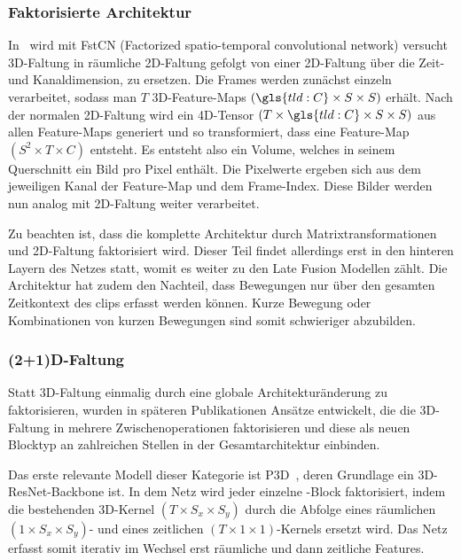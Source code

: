 \subsubsection{Faktorisierte Architektur}

In~\cite{Sun15} wird mit FstCN (Factorized spatio-temporal convolutional network) versucht 3D-Faltung in räumliche 2D-Faltung gefolgt von einer 2D-Faltung über die Zeit- und Kanaldimension, zu ersetzen.
Die Frames werden zunächst einzeln verarbeitet, sodass man ${T}$ 3D-Feature-Maps $(\gls{tld:C} \times S \times S)$ erhält.
Nach der normalen 2D-Faltung wird ein 4D-Tensor $(T \times \gls{tld:C} \times S \times S)$ aus allen Feature-Maps generiert und so transformiert, dass eine Feature-Map $(S^2 \times T \times C)$ entsteht.
Es entsteht also ein Volume, welches in seinem Querschnitt ein Bild pro Pixel enthält.
Die Pixelwerte ergeben sich aus dem jeweiligen Kanal der Feature-Map und dem Frame-Index.
Diese Bilder werden nun analog mit 2D-Faltung weiter verarbeitet.

Zu beachten ist, dass die komplette Architektur durch Matrixtransformationen und 2D-Faltung faktorisiert wird.
Dieser Teil findet allerdings erst in den hinteren Layern des Netzes statt, womit es weiter zu den Late Fusion Modellen zählt.
Die Architektur hat zudem den Nachteil, dass Bewegungen nur über den gesamten Zeitkontext des \glspl{clip} erfasst werden können.
Kurze Bewegung oder Kombinationen von kurzen Bewegungen sind somit schwieriger abzubilden.

\subsubsection{(2+1)D-Faltung}

Statt 3D-Faltung einmalig durch eine globale Architekturänderung zu faktorisieren, wurden in späteren Publikationen Ansätze entwickelt, die die 3D-Faltung in mehrere Zwischenoperationen faktorisieren und diese als neuen Blocktyp an zahlreichen Stellen in der Gesamtarchitektur einbinden.

Das erste relevante Modell dieser Kategorie ist P3D~\cite{Qiu17}, deren Grundlage ein 3D-ResNet-Backbone ist.
In dem Netz wird jeder einzelne \res-Block faktorisiert, indem die bestehenden 3D-Kernel $(T \times S_x \times S_y)$ durch die Abfolge eines räumlichen $(1 \times S_x \times S_y)$- und eines zeitlichen $(T \times 1 \times 1)$-Kernels ersetzt wird.
Das Netz erfasst somit iterativ im Wechsel erst räumliche und dann zeitliche Features.

